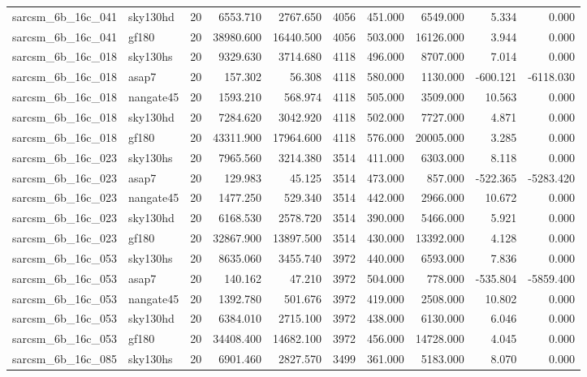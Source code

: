 \documentclass{article}
\begin{document}
\begin{longtable}{llrrrrrrrr}
sarcsm\_6b\_16c\_041 & sky130hd & 20 & 6553.710 & 2767.650 & 4056 & 451.000 & 6549.000 & 5.334 & 0.000 \\
sarcsm\_6b\_16c\_041 & gf180 & 20 & 38980.600 & 16440.500 & 4056 & 503.000 & 16126.000 & 3.944 & 0.000 \\
sarcsm\_6b\_16c\_018 & sky130hs & 20 & 9329.630 & 3714.680 & 4118 & 496.000 & 8707.000 & 7.014 & 0.000 \\
sarcsm\_6b\_16c\_018 & asap7 & 20 & 157.302 & 56.308 & 4118 & 580.000 & 1130.000 & -600.121 & -6118.030 \\
sarcsm\_6b\_16c\_018 & nangate45 & 20 & 1593.210 & 568.974 & 4118 & 505.000 & 3509.000 & 10.563 & 0.000 \\
sarcsm\_6b\_16c\_018 & sky130hd & 20 & 7284.620 & 3042.920 & 4118 & 502.000 & 7727.000 & 4.871 & 0.000 \\
sarcsm\_6b\_16c\_018 & gf180 & 20 & 43311.900 & 17964.600 & 4118 & 576.000 & 20005.000 & 3.285 & 0.000 \\
sarcsm\_6b\_16c\_023 & sky130hs & 20 & 7965.560 & 3214.380 & 3514 & 411.000 & 6303.000 & 8.118 & 0.000 \\
sarcsm\_6b\_16c\_023 & asap7 & 20 & 129.983 & 45.125 & 3514 & 473.000 & 857.000 & -522.365 & -5283.420 \\
sarcsm\_6b\_16c\_023 & nangate45 & 20 & 1477.250 & 529.340 & 3514 & 442.000 & 2966.000 & 10.672 & 0.000 \\
sarcsm\_6b\_16c\_023 & sky130hd & 20 & 6168.530 & 2578.720 & 3514 & 390.000 & 5466.000 & 5.921 & 0.000 \\
sarcsm\_6b\_16c\_023 & gf180 & 20 & 32867.900 & 13897.500 & 3514 & 430.000 & 13392.000 & 4.128 & 0.000 \\
sarcsm\_6b\_16c\_053 & sky130hs & 20 & 8635.060 & 3455.740 & 3972 & 440.000 & 6593.000 & 7.836 & 0.000 \\
sarcsm\_6b\_16c\_053 & asap7 & 20 & 140.162 & 47.210 & 3972 & 504.000 & 778.000 & -535.804 & -5859.400 \\
sarcsm\_6b\_16c\_053 & nangate45 & 20 & 1392.780 & 501.676 & 3972 & 419.000 & 2508.000 & 10.802 & 0.000 \\
sarcsm\_6b\_16c\_053 & sky130hd & 20 & 6384.010 & 2715.100 & 3972 & 438.000 & 6130.000 & 6.046 & 0.000 \\
sarcsm\_6b\_16c\_053 & gf180 & 20 & 34408.400 & 14682.100 & 3972 & 456.000 & 14728.000 & 4.045 & 0.000 \\
sarcsm\_6b\_16c\_085 & sky130hs & 20 & 6901.460 & 2827.570 & 3499 & 361.000 & 5183.000 & 8.070 & 0.000 \\

\end{longtable}
\end{document}
